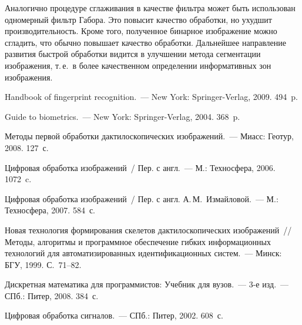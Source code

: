 \begin{multicols}{2}
  Аналогично процедуре сглаживания в качестве фильтра может быть 
использован одномерный фильтр Габора. Это повысит качество обработки, но 
ухудшит производительность. Кроме того, полученное бинарное изображение 
можно сгладить, что обычно повышает качество обработки. Дальнейшее 
направление развития быстрой обработки видится в улучшении метода 
сегментации изображения, т.\,е.\ в более качественном определении 
информативных зон изображения.

{\small\frenchspacing
{%
\begin{thebibliography}{9}

 Handbook of fingerprint 
recognition.~--- New York: Springer-Verlag, 2009. 494~p.

Guide to biometrics.~--- New York: Springer-Verlag, 2004. 368~p.

 Методы первой обработки дактилоскопических 
изображений.~--- Миасс: Геотур, 2008. 127~с.

 Цифровая обработка изображений~/ Пер. с англ.~--- 
М.: Техносфера, 2006. 1072~c.

Цифровая обработка изображений~/ Пер. с англ. А.\,М.~Измайловой.~--- М.: 
Техносфера, 2007. 584~с.

Новая технология формирования скелетов дактилоскопических изображений~// 
Методы, алгоритмы и программное обеспечение гибких информационных 
технологий для автоматизированных идентификационных систем.~--- Минск: 
БГУ, 1999. С.~71--82.

Дискретная математика для программистов: Учебник для вузов.~--- 3-е изд.~--- 
СПб.: Питер, 2008. 384~с.

\label{end\stat}

Цифровая обработка сигналов.~--- СПб.: Питер, 2002. 608~с.
 \end{thebibliography}
}
}


\end{multicols}       